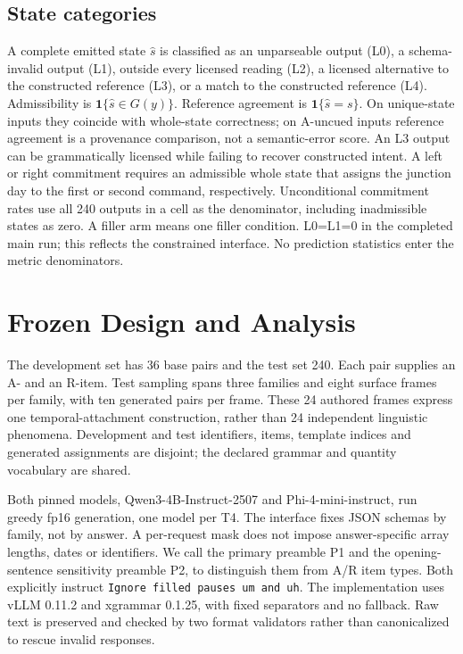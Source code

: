 \documentclass[11pt]{article}
\begin{document}
\subsection{State categories}
A complete emitted state $\hat{s}$ is classified as an unparseable output (L0), a schema-invalid output (L1), outside every licensed reading (L2), a licensed alternative to the constructed reference (L3), or a match to the constructed reference (L4). Admissibility is $\mathbf{1}\{\hat{s}\in G(y)\}$. Reference agreement is $\mathbf{1}\{\hat{s}=s\}$. On unique-state inputs they coincide with whole-state correctness; on A-uncued inputs reference agreement is a provenance comparison, not a semantic-error score. An L3 output can be grammatically licensed while failing to recover constructed intent. A left or right commitment requires an admissible whole state that assigns the junction day to the first or second command, respectively. Unconditional commitment rates use all 240 outputs in a cell as the denominator, including inadmissible states as zero. A filler arm means one filler condition. L0=L1=0 in the completed main run; this reflects the constrained interface. No prediction statistics enter the metric denominators.

\section{Frozen Design and Analysis}
The development set has 36 base pairs and the test set 240. Each pair supplies an A- and an R-item. Test sampling spans three families and eight surface frames per family, with ten generated pairs per frame. These 24 authored frames express one temporal-attachment construction, rather than 24 independent linguistic phenomena. Development and test identifiers, items, template indices and generated assignments are disjoint; the declared grammar and quantity vocabulary are shared.

Both pinned models, Qwen3-4B-Instruct-2507 and Phi-4-mini-instruct, run greedy fp16 generation, one model per T4. The interface fixes JSON schemas by family, not by answer. A per-request mask does not impose answer-specific array lengths, dates or identifiers. We call the primary preamble P1 and the opening-sentence sensitivity preamble P2, to distinguish them from A/R item types. Both explicitly instruct \texttt{Ignore filled pauses um and uh}. The implementation uses vLLM 0.11.2 and xgrammar 0.1.25, with fixed separators and no fallback. Raw text is preserved and checked by two format validators rather than canonicalized to rescue invalid responses.
\end{document}
